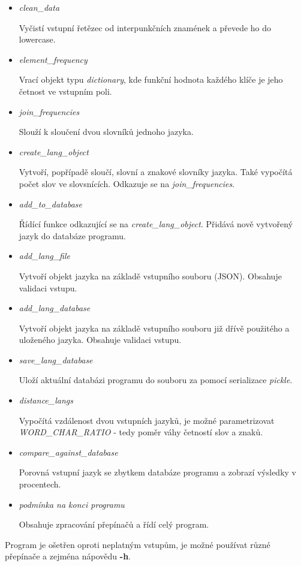 \documentclass[11pt]{article}
\begin{document}
\begin{itemize}
\item \textit{clean\_data}

Vyčistí vstupní řetězec od interpunkčních znamének a převede ho do lowercase.
\item \textit{element\_frequency}

Vrací objekt typu \textit{dictionary}, kde funkční hodnota každého klíče je jeho četnost ve vstupním poli.
\item \textit{join\_frequencies}

Slouží k sloučení dvou slovníků jednoho jazyka.
\item \textit{create\_lang\_object}

Vytvoří, popřípadě sloučí, slovní a znakové slovníky jazyka. Také vypočítá počet slov ve slovsnících. Odkazuje se na \textit{join\_frequencies}.
\item \textit{add\_to\_database}

Řídící funkce odkazující se na \textit{create\_lang\_object}. Přidává nově vytvořený jazyk do databáze programu.
\item \textit{add\_lang\_file}

Vytvoří objekt jazyka na základě vstupního souboru (JSON). Obsahuje validaci vstupu.
\item \textit{add\_lang\_database}

Vytvoří objekt jazyka na základě vstupního souboru již dřívě použitého a uloženého jazyka. Obsahuje validaci vstupu.
\item \textit{save\_lang\_database}

Uloží aktuální databázi programu do souboru za pomocí serializace \textit{pickle}.
\item \textit{distance\_langs}

Vypočítá vzdálenost dvou vstupních jazyků, je možné parametrizovat \textit{WORD\_CHAR\_RATIO} - tedy poměr váhy četností slov a znaků.
\item \textit{compare\_against\_database}

Porovná vstupní jazyk se zbytkem databáze programu a zobrazí výsledky v procentech.
\item \textit{podmínka na konci programu}

Obsahuje zpracování přepínačů a řídí celý program.
\end{itemize}

Program je ošetřen oproti neplatným vstupům, je možné používat různé přepínače a zejména nápovědu \textbf{-h}.
\end{document}
